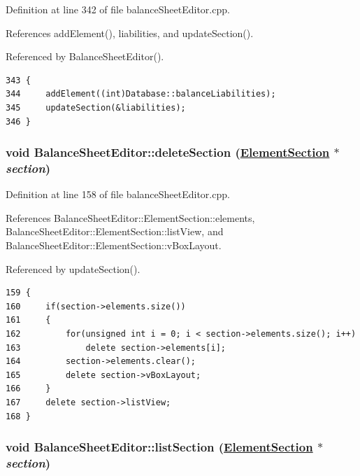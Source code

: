 Definition at line 342 of file balance\-Sheet\-Editor.cpp.

References add\-Element(), liabilities, and update\-Section().

Referenced by Balance\-Sheet\-Editor().

\footnotesize\begin{verbatim}343 {
344     addElement((int)Database::balanceLiabilities);
345     updateSection(&liabilities);
346 }
\end{verbatim}\normalsize 


\hypertarget{classBalanceSheetEditor_d1}{
\subsubsection[deleteSection]{\setlength{\rightskip}{0pt plus 5cm}void Balance\-Sheet\-Editor::delete\-Section (\hyperlink{structBalanceSheetEditor_1_1ElementSection}{Element\-Section} $\ast$ {\em section})}}
\label{classBalanceSheetEditor_d1}


Definition at line 158 of file balance\-Sheet\-Editor.cpp.

References Balance\-Sheet\-Editor::Element\-Section::elements, Balance\-Sheet\-Editor::Element\-Section::list\-View, and Balance\-Sheet\-Editor::Element\-Section::v\-Box\-Layout.

Referenced by update\-Section().

\footnotesize\begin{verbatim}159 {
160     if(section->elements.size())
161     {
162         for(unsigned int i = 0; i < section->elements.size(); i++)
163             delete section->elements[i];
164         section->elements.clear();
165         delete section->vBoxLayout;
166     }
167     delete section->listView;
168 }
\end{verbatim}\normalsize 


\hypertarget{classBalanceSheetEditor_d0}{
\subsubsection[listSection]{\setlength{\rightskip}{0pt plus 5cm}void Balance\-Sheet\-Editor::list\-Section (\hyperlink{structBalanceSheetEditor_1_1ElementSection}{Element\-Section} $\ast$ {\em section})}}
\label{classBalanceSheetEditor_d0}



